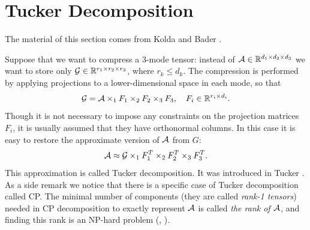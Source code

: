 \section{Tucker Decomposition}

The material of this section comes from Kolda and Bader \cite{kolda_bader_2009}.

Suppose that we want to compress a $3$-mode tensor: instead of $\mathcal{A} \in \mathbb{R}^{d_1 \times d_2 \times d_3}$
we want to store only $\mathcal{G} \in \mathbb{R}^{r_1 \times r_2 \times r_3}$, where $r_k \leq d_k$.
The compression is performed by applying projections to a lower-dimensional
space in each mode, so that
\begin{equation}
    \mathcal{G} = \mathcal{A} \times_1 F_1 \times_2 F_2 \times_3 F_3, \quad F_i \in \mathbb{R}^{r_i \times d_i}.
\end{equation}
Though it  is not necessary to impose any constraints on the  projection matrices $F_i$,
it is usually assumed that they have orthonormal columns. In this case it is
easy to restore the approximate version of $\mathcal{A}$ from $G$:
\begin{equation}
    \mathcal{A} \approx \mathcal{G} \times _{1} F_1^T \times _{2} F_2^T \times _{3} F_3^T.
\end{equation}
This approximation is called Tucker decomposition. It was introduced in Tucker \cite{tucker_63}.
As a side remark we notice that there is a specific case of Tucker decomposition
called CP. The minimal number of components (they are called \textit{rank-1 tensors}) needed
in CP decomposition to exactly represent $\mathcal{A}$ is called \textit{the rank of $\mathcal{A}$}, and
finding this rank is an NP-hard problem (\cite{tensor_rank_np_complete}, \cite{tensors_np_hard}).



